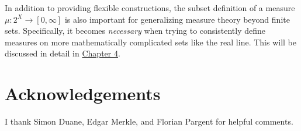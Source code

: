 \documentclass[
  letterpaper,
  DIV=11,
  numbers=noendperiod]{scrartcl}
\begin{document}
In addition to providing flexible constructions, the subset definition
of a measure \(\mu : 2^{X} \rightarrow [0, \infty]\) is also important
for generalizing measure theory beyond finite sets. Specifically, it
becomes \emph{necessary} when trying to consistently define measures on
more mathematically complicated sets like the real line. This will be
discussed in detail in
\href{http://www.symplectomorphic.com/assets/chapters_html/probability_on_general_spaces.html}{Chapter
4}.

\section{Acknowledgements}\label{acknowledgements}

I thank Simon Duane, Edgar Merkle, and Florian Pargent for helpful
comments.
\end{document}
